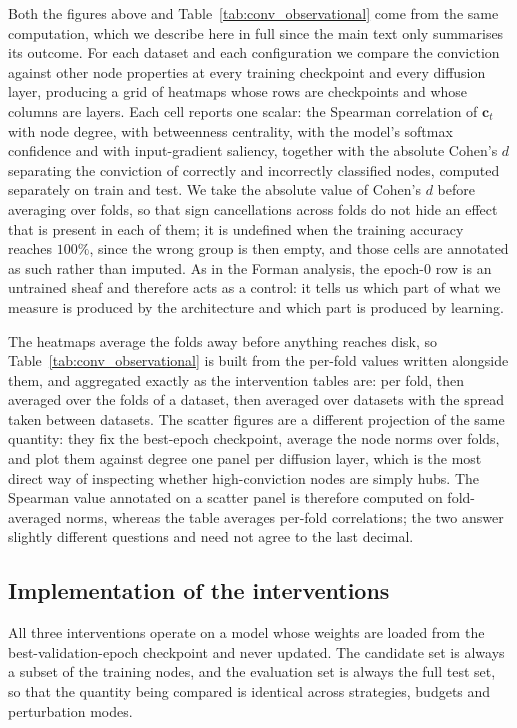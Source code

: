 Both the figures above and Table~\ref{tab:conv_observational} come from the same
computation, which we describe here in full since the main text only summarises
its outcome. For each dataset and each configuration we compare the conviction
against other node properties at every training checkpoint and every diffusion
layer, producing a grid of heatmaps whose rows are checkpoints and whose columns
are layers. Each cell reports one scalar: the Spearman correlation of
$\mathbf{c}_t$ with node degree, with betweenness centrality, with the model's
softmax confidence and with input-gradient saliency, together with the absolute
Cohen's $d$ separating the conviction of correctly and incorrectly classified
nodes, computed separately on train and test. We take the absolute value of
Cohen's $d$ before averaging over folds, so that sign cancellations across folds
do not hide an effect that is present in each of them; it is undefined when the
training accuracy reaches $100\%$, since the wrong group is then empty, and those
cells are annotated as such rather than imputed. As in the Forman analysis, the
epoch-$0$ row is an untrained sheaf and therefore acts as a control: it tells us
which part of what we measure is produced by the architecture and which part is
produced by learning.

The heatmaps average the folds away before anything reaches disk, so
Table~\ref{tab:conv_observational} is built from the per-fold values written
alongside them, and aggregated exactly as the intervention tables are: per fold,
then averaged over the folds of a dataset, then averaged over datasets with the
spread taken between datasets. The scatter figures are a different projection of
the same quantity: they fix the best-epoch checkpoint, average the node norms
over folds, and plot them against degree one panel per diffusion layer, which is
the most direct way of inspecting whether high-conviction nodes are simply hubs.
The Spearman value annotated on a scatter panel is therefore computed on
fold-averaged norms, whereas the table averages per-fold correlations; the two
answer slightly different questions and need not agree to the last decimal.

\subsection{Implementation of the interventions}
\label{sec:supp_impl}

All three interventions operate on a model whose weights are loaded from the
best-validation-epoch checkpoint and never updated. The candidate set is always
a subset of the training nodes, and the evaluation set is always the full test
set, so that the quantity being compared is identical across strategies,
budgets and perturbation modes.

